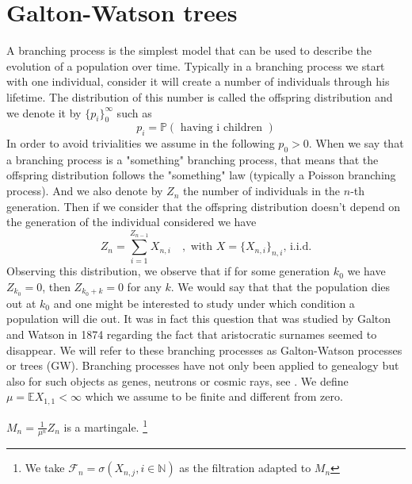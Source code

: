 \section{Galton-Watson trees}
A branching process is the simplest model that can be used to describe the evolution of a population over time.
Typically in a branching process we start with one individual, consider it will create a number of individuals through his lifetime. 
The distribution of this number is called the offspring distribution and we denote it by $\{p_i\}_0^{\infty}$ such as
\begin{equation}
	p_i = \mathbb{P}(\text{ having i children })
\end{equation}
In order to avoid trivialities we assume in the following $p_0>0$.
When we say that a branching process is a "something" branching process, that means that the offspring distribution follows the "something" law (typically a Poisson branching process).
And we also denote by $Z_n$ the number of individuals in the $n$-th generation. 
Then if we consider that the offspring distribution doesn't depend on the generation of the individual considered we have
\begin{equation}
	Z_n = \sum_{i=1}^{Z_{n-1}}X_{n, i} \quad, \text{ with } X = \{X_{n,i}\}_{n,i} \text{,  i.i.d.}
\end{equation}
Observing this distribution, we observe that if for some generation $k_0$ we have $Z_{k_0} = 0$, then $Z_{k_0 + k} = 0$ for any $k$. We would say that that the population dies out at $k_0$ and one might be interested to study under which condition a population will die out.
It was in fact this question that was studied by Galton and Watson in 1874 regarding the fact that aristocratic surnames seemed to disappear.
We will refer to these branching processes as Galton-Watson processes or trees (GW).
Branching processes have not only been applied to genealogy but also for such objects as genes, neutrons or cosmic rays, see \cite{Harris64}.
\newline
We define $\mu = \mathbb{E} X_{1,1} < \infty$ which we assume to be finite and different from zero.
\begin{lemma}\label{martinGW}
	$M_n = \frac{1}{\mu^n}Z_n$ is a martingale. 
	\footnote{We take $\mathcal{F}_n = \sigma(X_{n,j} , i \in \mathbb{N})$ as the filtration adapted to $M_n$ }
\end{lemma}
